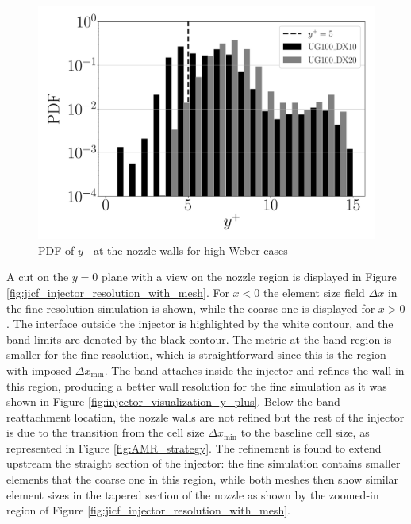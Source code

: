\begin{figure}[ht]
	\centering
   \includegraphics[scale=0.20]{./part2_developments/figures_ch5_resolved_JICF/instabilities_resolution/y_plus_injector}
   \vspace{-0.35in}
   \caption{PDF of $y^+$ at the nozzle walls for high Weber cases}
   \label{fig:jicf_nozzle_y_plus_PDF}
\end{figure}



A cut on the $y = 0$ plane with a view on the nozzle region is displayed in Figure \ref{fig:jicf_injector_resolution_with_mesh}.  For $x < 0$ the element size field $\Delta x$ in the fine resolution simulation is shown, while the coarse one is displayed for $x > 0$. The interface outside the injector is highlighted by the white contour, and the band limits are denoted by the black contour. The metric at the band region is smaller for the fine resolution, which is straightforward since this is the region with imposed $\Delta x_\mathrm{min}$. The band attaches inside the injector and refines the wall in this region, producing a better wall resolution for the fine simulation as it was shown in Figure \ref{fig:injector_visualization_y_plus}. Below the band reattachment location, the nozzle walls are not refined but the rest of the injector is due to the transition from the cell size $\Delta x_\mathrm{min}$ to the baseline cell size, as represented in Figure \ref{fig:AMR_strategy}. The refinement is found to extend upstream the straight section of the injector: the fine simulation contains smaller elements that the coarse one in this region, while both meshes then show similar element sizes in the tapered section of the nozzle as shown by the zoomed-in region of Figure \ref{fig:jicf_injector_resolution_with_mesh}.

